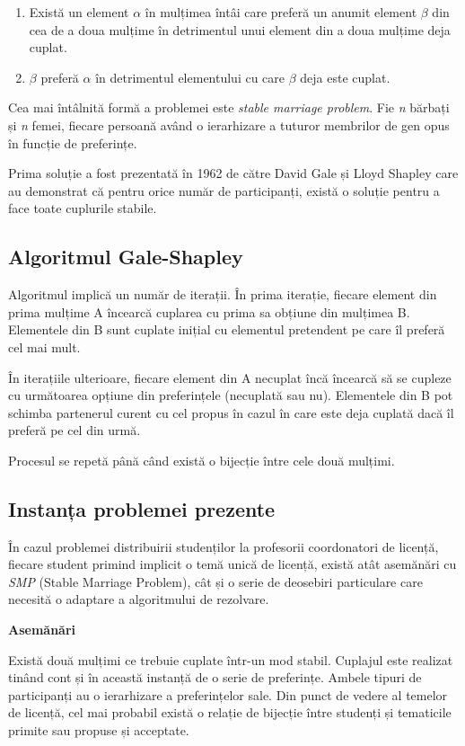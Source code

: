 \begin{enumerate}
	\item Există un element $\alpha$ în mulțimea întâi care preferă un anumit element $\beta$ din cea de a doua mulțime în detrimentul unui element din a doua mulțime deja cuplat.
	\item $\beta$ preferă $\alpha$ în detrimentul elementului cu care $\beta$ deja este cuplat.
\end{enumerate}

Cea mai întâlnită formă a problemei este \textit{stable marriage problem}. Fie \textit{n} bărbați și \textit{n} femei, fiecare persoană având o ierarhizare a tuturor membrilor de gen opus în funcție de preferințe. 

Prima soluție a fost prezentată în 1962 de către David Gale și Lloyd Shapley care au demonstrat că pentru orice număr de participanți, există o soluție pentru a face toate cuplurile stabile.

\subsection{Algoritmul Gale-Shapley}
Algoritmul implică un număr de iterații. În prima iterație, fiecare element din prima mulțime A încearcă cuplarea cu prima sa obțiune din mulțimea B. Elementele din B sunt cuplate inițial cu elementul pretendent pe care îl preferă cel mai mult.

În iterațiile ulterioare, fiecare element din A necuplat încă încearcă să se cupleze cu următoarea opțiune din preferințele (necuplată sau nu). Elementele din B pot schimba partenerul curent cu cel propus în cazul în care este deja cuplată dacă îl preferă pe cel din urmă.

Procesul se repetă până când există o bijecție între cele două mulțimi.

\subsection{Instanța problemei prezente}
În cazul problemei distribuirii studenților la profesorii coordonatori de licență, fiecare student primind implicit o temă unică de licență, există atât asemănări cu \textit{SMP} (Stable Marriage Problem), cât și o serie de deosebiri particulare care necesită o adaptare a algoritmului de rezolvare.

\textbf{Asemănări}

Există două mulțimi ce trebuie cuplate într-un mod stabil. Cuplajul este realizat tinând cont și în această instanță de o serie de preferințe. Ambele tipuri de participanți au o ierarhizare a preferințelor sale. Din punct de vedere al temelor de licență, cel mai probabil există o relație de bijecție între studenți și tematicile primite sau propuse și acceptate.

